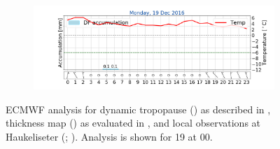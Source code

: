 \begin{figure}[ht!]
	\begin{subfigure}[b]{0.49\textwidth}
		\includegraphics[trim={4.9cm 1.cm 1.5cm 1cm},clip,
		width=\textwidth]{./fig_weathermast/T_P_U_20161219}
		\caption{} \label{fig:TPU19}
	\end{subfigure}
	\caption{ECMWF analysis for dynamic tropopause (\protect{}) as described in , thickness map (\protect{}) as evaluated in , and local observations at Haukeliseter (\protect{}; ). Analysis is shown for \SI{19}{\dec} at 0\SI{0}{\UTC}. %
    }\label{fig:weather:19}
\end{figure}




